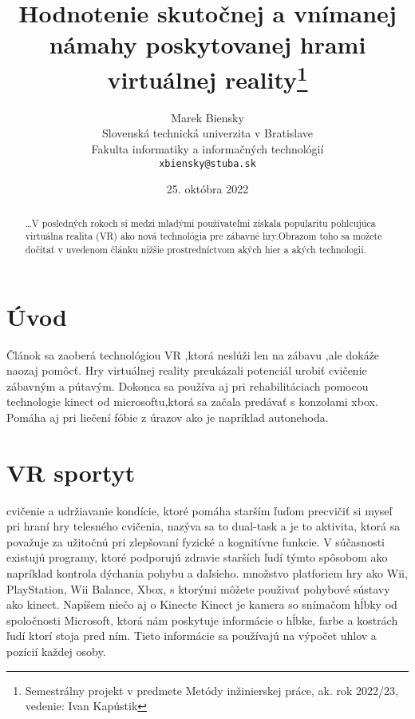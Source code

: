 \documentclass[10pt,oneside,slovak,a4paper]{article}
\title{Hodnotenie skutočnej a vnímanej námahy poskytovanej hrami virtuálnej reality\thanks{Semestrálny projekt v predmete Metódy inžinierskej práce, ak. rok 2022/23, vedenie: Ivan Kapústik}}
\author{Marek Biensky\\[2pt]
	{\small Slovenská technická univerzita v Bratislave}\\
	{\small Fakulta informatiky a informačných technológií}\\
	{\small \texttt{xbiensky@stuba.sk}}
	}
\date{\small 25. októbra 2022}
\begin{document}
\maketitle

\begin{abstract}
 \ldots V posledných rokoch si medzi mladými používateľmi získala popularitu pohlcujúca virtuálna realita (VR) ako nová technológia pre zábavné hry.Obrazom toho sa možete dočítať v uvedenom článku nižšie prostredníctvom akých hier a akých technologií.
\end{abstract}


\section{Úvod}
Článok sa zaoberá technológiou VR ,ktorá neslúži len na zábavu ,ale dokáže naozaj pomôcť.
Hry virtuálnej reality preukázali potenciál urobiť cvičenie zábavným a pútavým.
Dokonca sa používa aj pri rehabilitáciach pomocou technologie kinect od microsoftu,ktorá sa začala predávať s konzolami xbox.
Pomáha aj pri liečení fóbie z úrazov ako je napríklad autonehoda.



\section{VR sportyt} \label{VR sport}

cvičenie a udržiavanie kondície, ktoré pomáha starším ľuďom precvičiť si myseľ pri hraní hry
telesného cvičenia, nazýva sa to dual-task a je to aktivita, ktorá sa považuje za užitočnú pri zlepšovaní
fyzické a kognitívne funkcie.
V súčasnosti existujú programy, ktoré podporujú zdravie starších ľudí týmto spôsobom ako napríklad kontrola dýchania pohybu a daľsieho. množstvo platforiem
hry ako Wii, PlayStation, Wii Balance, Xbox, s ktorými môžete použivať pohybové sústavy ako kinect.
Napíšem niečo aj o Kinecte
Kinect je kamera so snímačom hĺbky od spoločnosti Microsoft, ktorá nám poskytuje informácie o hĺbke, farbe a kostrách ľudí
ktorí stoja pred ním. Tieto informácie sa používajú na výpočet uhlov a pozícií každej osoby.


\end{document}
